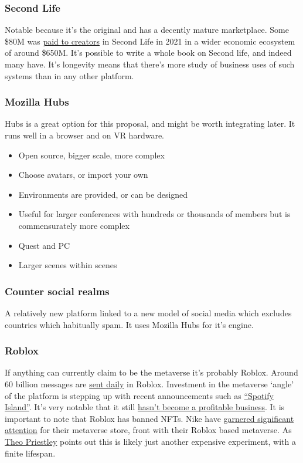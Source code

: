 \subsubsection{Second Life}
Notable because it's the original and has a decently mature marketplace. Some \$80M was \href{https://www.zdnet.com/article/high-fidelity-invests-in-second-life-to-expand-virtual-world/}{paid to creators} in Second Life in 2021 in a wider economic ecosystem of around \$650M. It's possible to write a whole book on Second life, and indeed many have. It's longevity means that there's more study of business uses of such systems than in any other platform. 
\subsubsection{Mozilla Hubs}
Hubs is a great option for this proposal, and might be worth integrating later. It runs well in a browser and on VR hardware.
\begin{itemize}
\item Open source, bigger scale, more complex
\item Choose avatars, or import your own
\item Environments are provided, or can be designed
\item Useful for larger conferences with hundreds or thousands of members but is commensurately more complex
\item Quest and PC
\item Larger scenes within scenes
\end{itemize}
\subsubsection{Counter social realms}
A relatively new platform linked to a new model of social media which excludes countries which habitually spam. It uses Mozilla Hubs for it's engine.
\subsubsection{Roblox}
If anything can currently claim to be the metaverse it's probably Roblox. Around 60 billion messages are \href{https://podcasts.apple.com/us/podcast/developments-investments-experiences-in-the-metaverse/id1593908027?i=1000540906629}{sent daily} in Roblox. Investment in the metaverse `angle' of the platform is stepping up with recent announcements such as \href{https://techcrunch.com/2022/05/03/spotify-becomes-first-music-streamer-to-launch-on-roblox/?}{``Spotify Island''}. It's very notable that it still \href{https://fortune.com/2022/06/03/roblox-gaming-ecosystem-metaverse-stocks-profit/}{hasn't become a profitable business}. It is important to note that Roblox has banned NFTs. Nike have \href{https://www.thedrum.com/news/2022/09/22/21m-people-have-now-visited-nike-s-roblox-store-here-s-how-do-metaverse-commerce}{garnered significant attention} for their metaverse store, front with their Roblox based metaverse. As \href{https://medium.com/@theo/why-nikeland-is-not-the-metaverse-success-story-you-think-it-is-46742dc2f231}{Theo Priestley} points out this is likely just another expensive experiment, with a finite lifespan.\\

